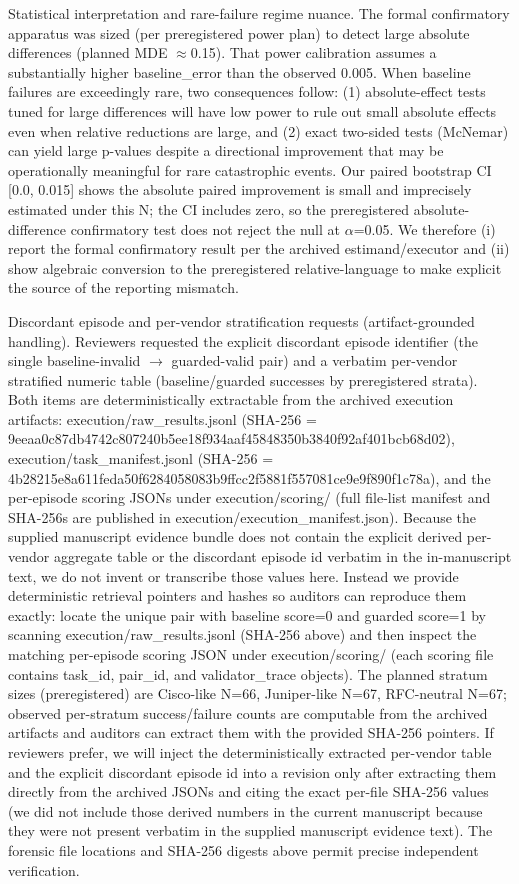 \documentclass[conference]{IEEEtran}
\begin{document}
Statistical interpretation and rare-failure regime nuance. The formal confirmatory apparatus was sized (per preregistered power plan) to detect large absolute differences (planned MDE \ensuremath{\approx}0.15). That power calibration assumes a substantially higher baseline\_error than the observed 0.005. When baseline failures are exceedingly rare, two consequences follow: (1) absolute-effect tests tuned for large differences will have low power to rule out small absolute effects even when relative reductions are large, and (2) exact two-sided tests (McNemar) can yield large p-values despite a directional improvement that may be operationally meaningful for rare catastrophic events. Our paired bootstrap CI [0.0, 0.015] shows the absolute paired improvement is small and imprecisely estimated under this N; the CI includes zero, so the preregistered absolute-difference confirmatory test does not reject the null at \ensuremath{\alpha}=0.05. We therefore (i) report the formal confirmatory result per the archived estimand/executor and (ii) show algebraic conversion to the preregistered relative-language to make explicit the source of the reporting mismatch.

Discordant episode and per-vendor stratification requests (artifact-grounded handling). Reviewers requested the explicit discordant episode identifier (the single baseline-invalid \ensuremath{\rightarrow} guarded-valid pair) and a verbatim per-vendor stratified numeric table (baseline/guarded successes by preregistered strata). Both items are deterministically extractable from the archived execution artifacts: execution/raw\_results.jsonl (SHA-256 = 9eeaa0c87db4742c807240b5ee18f934aaf45848350b3840f92af401bcb68d02), execution/task\_manifest.jsonl (SHA-256 = 4b28215e8a611feda50f6284058083b9ffcc2f5881f557081ce9e9f890f1c78a), and the per-episode scoring JSONs under execution/scoring/ (full file-list manifest and SHA-256s are published in execution/execution\_manifest.json). Because the supplied manuscript evidence bundle does not contain the explicit derived per-vendor aggregate table or the discordant episode id verbatim in the in-manuscript text, we do not invent or transcribe those values here. Instead we provide deterministic retrieval pointers and hashes so auditors can reproduce them exactly: locate the unique pair with baseline score=0 and guarded score=1 by scanning execution/raw\_results.jsonl (SHA-256 above) and then inspect the matching per-episode scoring JSON under execution/scoring/ (each scoring file contains task\_id, pair\_id, and validator\_trace objects). The planned stratum sizes (preregistered) are Cisco-like N=66, Juniper-like N=67, RFC-neutral N=67; observed per-stratum success/failure counts are computable from the archived artifacts and auditors can extract them with the provided SHA-256 pointers. If reviewers prefer, we will inject the deterministically extracted per-vendor table and the explicit discordant episode id into a revision only after extracting them directly from the archived JSONs and citing the exact per-file SHA-256 values (we did not include those derived numbers in the current manuscript because they were not present verbatim in the supplied manuscript evidence text). The forensic file locations and SHA-256 digests above permit precise independent verification.
\end{document}

